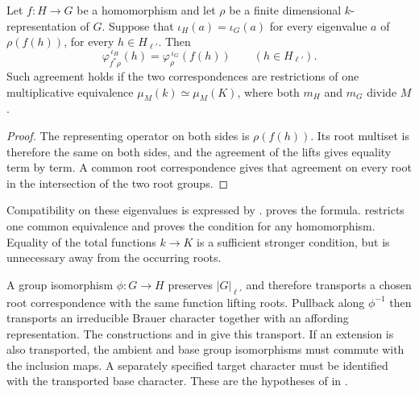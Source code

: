 \begin{proposition}
\label{lib:brauer:compatible-pullback}
Let $f:H\to G$ be a homomorphism and let $\rho$ be a finite dimensional
$k$-representation of $G$. Suppose that $\iota_H(a)=\iota_G(a)$
for every eigenvalue $a$ of $\rho(f(h))$, for every $h\in H_{\ell'}$.
Then
\[
 \varphi_{f^*\rho}^{\,\iota_H}(h)
     =\varphi_\rho^{\,\iota_G}(f(h))
       \qquad(h\in H_{\ell'}).
\]
Such agreement holds if the two correspondences are restrictions of one
multiplicative equivalence $\mu_M(k)\simeq\mu_M(K)$, where both
$m_H$ and $m_G$ divide $M$.
\end{proposition}
\begin{proof}
The representing operator on both sides is $\rho(f(h))$. Its root
multiset is therefore the same on both sides, and the agreement of
the lifts gives equality term by term. A common root correspondence
gives that agreement on every root in the intersection of the two
root groups.
\end{proof}

\begin{implementation}
Compatibility on these eigenvalues is expressed by
.
proves the formula.
 restricts one
common equivalence and proves the condition for any homomorphism.
Equality of the total functions $k\to K$ is a sufficient stronger
condition, but is unnecessary away from the occurring roots.
\end{implementation}

A group isomorphism $\phi:G\to H$ preserves $|G|_{\ell'}$ and therefore
transports a chosen root correspondence with the same function lifting
roots. Pullback along $\phi^{-1}$ then transports an irreducible Brauer
character together with an affording representation. The constructions
 and
 in
 give this transport.
If an extension is also transported, the ambient and base group
isomorphisms must commute with the inclusion maps. A separately specified
target character must be identified with the transported base character.
These are the hypotheses of
in .

